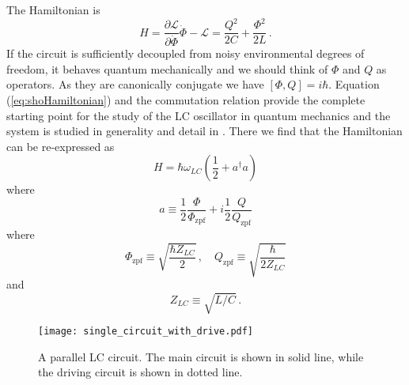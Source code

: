 The Hamiltonian is
\begin{equation}
H = \frac{\partial \mathcal{L}}{\partial \dot{\Phi}} \dot{\Phi} - \mathcal{L}
= \frac{Q^2}{2C} + \frac{\Phi^2}{2L} \, . \label{eq:shoHamiltonian}
\end{equation}
If the circuit is sufficiently decoupled from noisy environmental degrees of freedom, it behaves quantum mechanically and we should think of $\Phi$ and $Q$ as operators.
As they are canonically conjugate we have $[\Phi,Q]=i\hbar$.
Equation (\ref{eq:shoHamiltonian}) and the commutation relation provide the complete starting point for the study of the LC oscillator in quantum mechanics and the system is studied in generality and detail in \citeinternaltype {}.
There we find that the Hamiltonian can be re-expressed as
\begin{equation}
H = \hbar \omega_{LC} \left( \frac{1}{2} + a^\dagger a \right)
\end{equation}
where
\begin{equation}
a \equiv
\frac{1}{2} \frac{\Phi}{\Phi_\text{zpf}}
+ i \frac{1}{2} \frac{Q}{Q_\text{zpf}}
\end{equation}
where
\begin{equation}
\Phi_\text{zpf} \equiv \sqrt{\frac{\hbar Z_{LC}}{2}} \, ,
\quad
Q_\text{zpf} \equiv \sqrt{\frac{\hbar}{2 Z_{LC}}}
\end{equation}
and
\begin{equation}
Z_{LC} \equiv \sqrt{L/C} \, .
\end{equation}

\begin{figure}
\begin{centering}
\texttt{[image: single\_circuit\_with\_drive.pdf]} 
\par\end{centering}
\caption{A parallel LC circuit. The main circuit is shown in solid line, while the driving circuit is shown in dotted line.}
\label{Fig:singleCircuit}
\end{figure}

